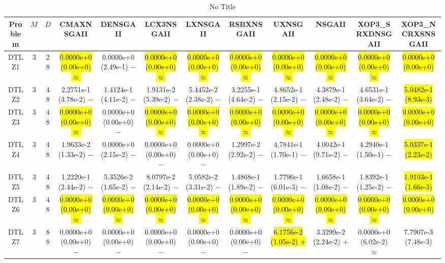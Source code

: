 \documentclass[journal]{IEEEtran}
\begin{document}
\begin{table*}[htbp]
\renewcommand{\arraystretch}{1.2}
\centering
\caption{No Title}
\begin{tabular}{cccccccccccc}
\toprule
Problem&$M$&$D$&CMAXNSGAII&DENSGAII&LCX3NSGAII&LXNSGAII&RSBXNSGAII&UXNSGAII&NSGAII&XOP3\_SRXDNSGAII&XOP3\_NCRXSNSGAII\\
\midrule
\multirow{1}{*}{DTLZ1}&3&28&\hl{0.0000e+0 (0.00e+0) $\approx$}&0.0000e+0 (2.49e-1) $-$&\hl{0.0000e+0 (0.00e+0) $\approx$}&\hl{0.0000e+0 (0.00e+0) $\approx$}&\hl{0.0000e+0 (0.00e+0) $\approx$}&\hl{0.0000e+0 (0.00e+0) $\approx$}&\hl{0.0000e+0 (0.00e+0) $\approx$}&\hl{0.0000e+0 (0.00e+0) $\approx$}&\hl{0.0000e+0 (0.00e+0)}\\
\hline
\multirow{1}{*}{DTLZ2}&3&48&2.2751e-1 (3.78e-2) $-$&1.4124e-1 (4.11e-2) $-$&1.9131e-2 (5.39e-2) $-$&5.4452e-2 (2.38e-2) $-$&3.2255e-1 (4.64e-2) $-$&4.8652e-1 (2.15e-2) $-$&4.3879e-1 (2.48e-2) $-$&4.6531e-1 (3.64e-2) $-$&\hl{5.0482e-1 (8.93e-3)}\\
\hline
\multirow{1}{*}{DTLZ3}&3&48&\hl{0.0000e+0 (0.00e+0) $\approx$}&0.0000e+0 (0.00e+0) $-$&\hl{0.0000e+0 (0.00e+0) $\approx$}&\hl{0.0000e+0 (0.00e+0) $\approx$}&\hl{0.0000e+0 (0.00e+0) $\approx$}&\hl{0.0000e+0 (0.00e+0) $\approx$}&\hl{0.0000e+0 (0.00e+0) $\approx$}&\hl{0.0000e+0 (0.00e+0) $\approx$}&\hl{0.0000e+0 (0.00e+0)}\\
\hline
\multirow{1}{*}{DTLZ4}&3&48&1.9633e-2 (1.33e-2) $-$&0.0000e+0 (2.15e-2) $-$&0.0000e+0 (0.00e+0) $-$&0.0000e+0 (0.00e+0) $-$&1.2997e-2 (2.92e-2) $-$&4.7841e-1 (1.70e-1) $-$&4.0042e-1 (9.71e-2) $-$&4.2940e-1 (1.50e-1) $-$&\hl{5.0337e-1 (2.23e-2)}\\
\hline
\multirow{1}{*}{DTLZ5}&3&48&1.2220e-1 (2.44e-2) $-$&5.3526e-2 (1.65e-2) $-$&8.0797e-2 (2.14e-2) $-$&5.0582e-2 (3.31e-2) $-$&1.4868e-1 (1.89e-2) $-$&1.7796e-1 (6.01e-3) $-$&1.6658e-1 (1.08e-2) $-$&1.8392e-1 (1.25e-2) $-$&\hl{1.9103e-1 (1.66e-3)}\\
\hline
\multirow{1}{*}{DTLZ6}&3&48&\hl{0.0000e+0 (0.00e+0) $\approx$}&\hl{0.0000e+0 (0.00e+0) $\approx$}&\hl{0.0000e+0 (0.00e+0) $\approx$}&\hl{0.0000e+0 (0.00e+0) $\approx$}&\hl{0.0000e+0 (0.00e+0) $\approx$}&\hl{0.0000e+0 (0.00e+0) $\approx$}&\hl{0.0000e+0 (0.00e+0) $\approx$}&\hl{0.0000e+0 (0.00e+0) $\approx$}&\hl{0.0000e+0 (0.00e+0)}\\
\hline
\multirow{1}{*}{DTLZ7}&3&88&0.0000e+0 (0.00e+0) $-$&0.0000e+0 (0.00e+0) $-$&0.0000e+0 (0.00e+0) $-$&0.0000e+0 (0.00e+0) $-$&0.0000e+0 (0.00e+0) $-$&\hl{6.1756e-2 (1.05e-2) $+$}&3.3299e-2 (2.24e-2) $+$&0.0000e+0 (6.02e-2) $\approx$&7.7907e-3 (7.48e-3)\\

\end{tabular}
\end{table*}
\end{document}
